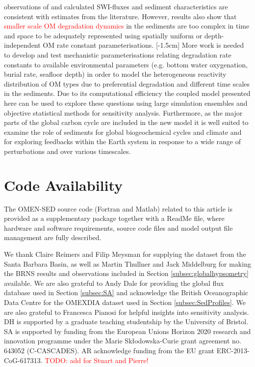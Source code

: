 \documentclass[gmd, manuscript]{copernicus}
\begin{document}
observations of \citet{seiter_organic_2004} and calculated SWI-fluxes and sediment characteristics are consistent with estimates from the literature. 
However, results also show that \textcolor{red}{smaller scale OM degradation dynamics} in the sediments are too complex in time and space to be adequately represented using spatially uniform or depth-independent OM rate constant parameterisations. 
[-1.5cm]%
More work is needed to develop and test mechanistic parameterisations relating degradation rate constants to available environmental parameters (e.g. bottom water oxygenation, burial rate, seafloor depth) in order to model the heterogeneous 
reactivity distribution of OM types due to preferential degradation and different time scales in the sediments. 
Due to its computational efficiency the coupled model presented here can be used to explore these questions using large simulation ensembles and objective statistical methods for sensitivity analysis. 
Furthermore, as the major parts of the global carbon cycle are included in the new model it is well suited to examine the role of sediments for global biogeochemical cycles and climate and for 
exploring feedbacks within the Earth system in response to a wide range of perturbations and over various timescales. 


\section {Code Availability}
The OMEN-SED source code (Fortran and Matlab) related to this article is provided
as a supplementary package together with a ReadMe file,
where hardware and software requirements, source code files
and model output file management are fully described.



\begin{acknowledgements}
We thank Claire Reimers and Filip Meysman for supplying the dataset from the Santa Barbara Basin, as well as Martin Thullner and Jack Middelburg for making the BRNS results and observations 
included in Section \ref{subsec:globalhypsometry} available. We are also grateful to Andy Dale for providing the global flux database used in Section \ref{subsec:SA} and 
acknowledge the British Oceanographic Data Centre for the OMEXDIA dataset used in Section \ref{subsec:SedProfiles}.
We are also grateful to Francesca Pianosi for helpful insights into sensitivity analysis. 
DH is supported by a graduate teaching studentship by the University of Bristol. SA is supported by funding from
the European Unions Horizon 2020 research and innovation programme under the Marie Sk\l{}odowska-Curie grant agreement no.
643052 (C-CASCADES). AR acknowledge funding from the EU grant ERC-2013-CoG-617313. 
\textcolor{red}{TODO: add for Stuart and Pierre!}
\end{acknowledgements}
\end{document}
